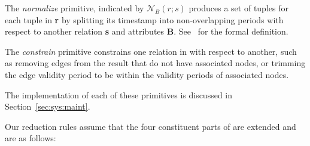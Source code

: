 The {\em normalize} primitive, indicated by $\mathcal{N}_B(r;s)$
produces a set of tuples for each tuple in {\bf r} by splitting its
timestamp into non-overlapping periods with respect to another
relation {\bf s} and attributes {\bf B}.  See~\cite{Dignos2012} for
the formal definition.

The {\em constrain} primitive constrains one relation in \tve with
respect to another, such as removing edges from the result that do not
have associated nodes, or trimming the edge validity period to be
within the validity periods of associated nodes.

The implementation of each of these primitives is discussed in
Section~\ref{sec:sys:maint}.

Our reduction rules assume that the four constituent parts of \tve are
extended and are as follows:

